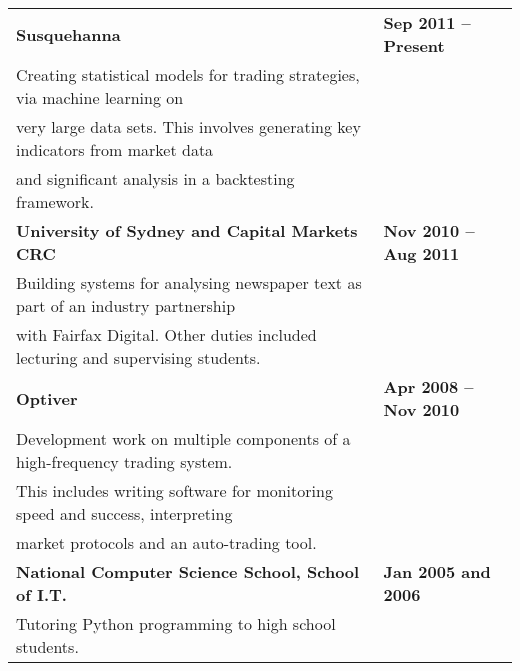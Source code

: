 \documentclass[]{article}
\begin{document}
\begin{table*}[h!]
\begin{tabular}[h!]{p{12.7cm}l}

\textbf{Susquehanna} & \textbf{Sep 2011 -- Present}\\
\hspace{0.5cm}Creating statistical models for trading strategies, via machine learning on& \\
\hspace{0.5cm}very large data sets. This involves generating key indicators from market data& \\
\hspace{0.5cm}and significant analysis in a backtesting framework. 
& \\

\textbf{University of Sydney and Capital Markets CRC} & \textbf{Nov 2010 -- Aug 2011}\\
\hspace{0.5cm}Building systems for analysing newspaper text as part of an industry partnership& \\
\hspace{0.5cm}with Fairfax Digital. Other duties included lecturing and supervising students.
& \\

\textbf{Optiver} & \textbf{Apr 2008 -- Nov 2010}\\
\hspace{0.5cm}Development work on multiple components of a high-frequency trading system.&\\
\hspace{0.5cm}This includes writing software for monitoring speed and success, interpreting&\\
\hspace{0.5cm}market protocols and an auto-trading tool.
& \\

\textbf{National Computer Science School, School of I.T.} & \textbf{Jan 2005 and 2006}\\
\hspace{0.5cm}Tutoring Python programming to high school students.
& \\


\end{tabular}
\end{table*}
\end{document}
